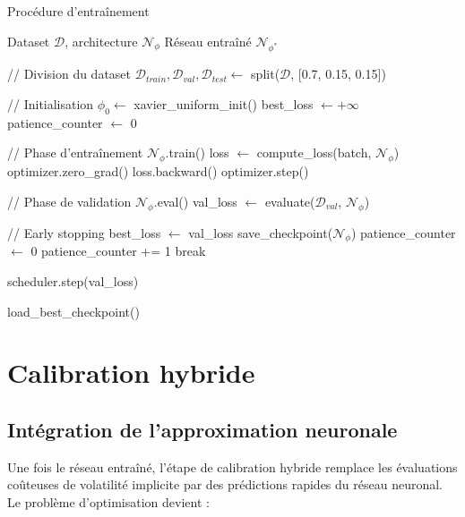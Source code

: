 \begin{algorithm}[H]
\caption{Procédure d'entraînement}
\begin{algorithmic}
\REQUIRE Dataset $\mathcal{D}$, architecture $\mathcal{N}_\phi$
\ENSURE Réseau entraîné $\mathcal{N}_{\phi^*}$

\STATE // Division du dataset
\STATE $\mathcal{D}_{train}, \mathcal{D}_{val}, \mathcal{D}_{test} \leftarrow$ split($\mathcal{D}$, [0.7, 0.15, 0.15])

\STATE // Initialisation
\STATE $\phi_0 \leftarrow$ xavier\_uniform\_init()
\STATE best\_loss $\leftarrow +\infty$
\STATE patience\_counter $\leftarrow$ 0

    \STATE // Phase d'entraînement
    \STATE $\mathcal{N}_\phi$.train()
        \STATE loss $\leftarrow$ compute\_loss(batch, $\mathcal{N}_\phi$)
        \STATE optimizer.zero\_grad()
        \STATE loss.backward()
        \STATE optimizer.step()
    \ENDFOR
    
    \STATE // Phase de validation
    \STATE $\mathcal{N}_\phi$.eval()
    \STATE val\_loss $\leftarrow$ evaluate($\mathcal{D}_{val}$, $\mathcal{N}_\phi$)
    
    \STATE // Early stopping
        \STATE best\_loss $\leftarrow$ val\_loss
        \STATE save\_checkpoint($\mathcal{N}_\phi$)
        \STATE patience\_counter $\leftarrow$ 0
    \ELSE
        \STATE patience\_counter += 1
            \STATE break
        \ENDIF
    \ENDIF
    
    \STATE scheduler.step(val\_loss)
\ENDFOR

\RETURN load\_best\_checkpoint()
\end{algorithmic}
\end{algorithm}

\section{Calibration hybride}

\subsection{Intégration de l'approximation neuronale}

Une fois le réseau entraîné, l'étape de calibration hybride remplace les évaluations coûteuses de volatilité implicite par des prédictions rapides du réseau neuronal. Le problème d'optimisation devient :

